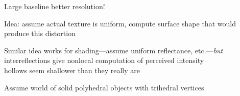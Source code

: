 \documentclass{article}
\begin{document}
\begin{huge}
Large baseline \mat{$\implies$} better resolution!




\vspace*{0.2in}

\textwidth
{}

Idea: assume actual texture is uniform, compute surface shape that would produce this distortion

Similar idea works for shading---assume uniform reflectance, etc.---\emph{but}\\
interreflections give nonlocal computation of perceived intensity\\
\mat{$\implies$} hollows seem shallower than they really are




\vspace*{0.2in}

\textwidth
{}

\textwidth
{}

Assume world of solid polyhedral objects with trihedral vertices



\vspace*{0.2in}

\textwidth
{}

\vspace*{0.2in}

\textwidth
{}



\end{huge}
\end{document}
